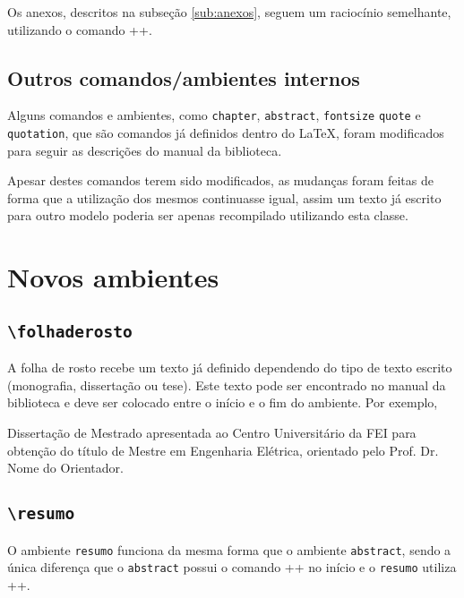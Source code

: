 \documentclass{fei}
\begin{document}
	Os anexos, descritos na subseção \ref{sub:anexos}, seguem um raciocínio semelhante, utilizando o comando \latexinline+\anexos+.
    
    \subsection{Outros comandos/ambientes internos}
    
    Alguns comandos e ambientes, como \texttt{chapter}, \texttt{abstract}, \texttt{fontsize} \texttt{quote} e \texttt{quotation}, que são comandos já definidos dentro do \LaTeX, foram modificados para seguir as descrições do manual da biblioteca.

    Apesar destes comandos terem sido modificados, as mudanças foram feitas de forma que a utilização dos mesmos continuasse igual, assim um texto já escrito para outro modelo poderia ser apenas recompilado utilizando esta classe.

\section{Novos ambientes}

    \subsection{\texttt{\textbackslash folhaderosto}}
    A folha de rosto recebe um texto já definido dependendo do tipo de texto escrito (monografia, dissertação ou tese). Este texto pode ser encontrado no manual da biblioteca e deve ser colocado entre o início e o fim do ambiente. Por exemplo,
    \begin{latexcode}
\begin{folhaderosto}
Dissertação de Mestrado apresentada ao Centro Universitário
da FEI para obtenção do título de Mestre em Engenharia
Elétrica, orientado pelo Prof. Dr. Nome do Orientador. 
\end{folhaderosto}
    \end{latexcode}

    \subsection{\texttt{\textbackslash resumo}}
    O ambiente \texttt{resumo} funciona da mesma forma que o ambiente \texttt{abstract}, sendo a única diferença que o \texttt{abstract} possui o comando \latexinline++ no início e o \texttt{resumo} utiliza \latexinline++.
\end{document}
